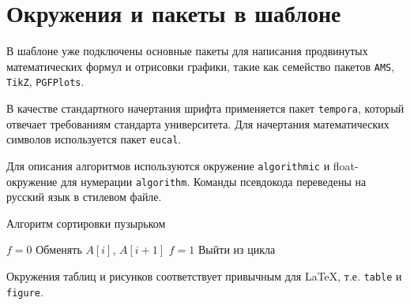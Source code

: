 \section{Окружения и пакеты в шаблоне}

В шаблоне уже подключены основные пакеты для написания продвинутых математических формул и отрисовки графики, такие как семейство пакетов \verb|AMS|, \verb|TikZ|, \verb|PGFPlots|.

В качестве стандартного начертания шрифта применяется пакет \verb|tempora|, который отвечает требованиям стандарта университета. Для начертания математических символов используется пакет \verb|eucal|.

Для описания алгоритмов используются окружение \verb|algorithmic| и float-окружение для нумерации \verb|algorithm|. Команды псевдокода переведены на русский язык в стилевом файле.

\begin{algorithm}
\caption{Алгоритм сортировки пузырьком}
\begin{algorithmic}[1]%
    \State $f=0$
            \State Обменять $A[i]$, $A[i+1]$
            \State $f=1$
        \EndIf
            \State Выйти из цикла
        \EndIf
    \EndFor
\EndFor
\end{algorithmic}
\end{algorithm}

Окружения таблиц и рисунков соответствует привычным для \LaTeX, т.е. \verb|table| и \verb|figure|.